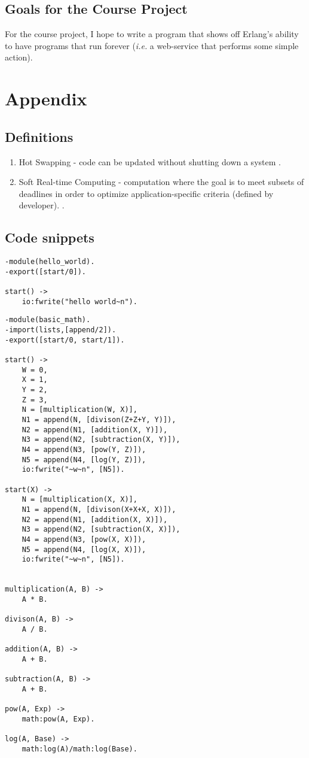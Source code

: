\documentclass[11 pt]{IEEEtran}
\begin{document}
\subsection{Goals for the Course Project}
For the course project, I hope to write a program that shows off Erlang's ability to have programs that run forever (\emph{i.e.} a web-service that performs some simple action). 

\newpage
\section{Appendix}
\subsection{Definitions}
\begin{enumerate}
\item  Hot Swapping - code can be updated without shutting down a system \cite{wiki}.
\item Soft Real-time Computing - computation where the goal is to meet subsets of deadlines in order to optimize application-specific criteria (defined by developer). \cite{soft-rt}.
\end{enumerate}
 
\subsection{Code snippets}

\begin{lstlisting}
-module(hello_world).
-export([start/0]).

start() ->
    io:fwrite("hello world~n").
\end{lstlisting}

\begin{lstlisting}
-module(basic_math).
-import(lists,[append/2]). 
-export([start/0, start/1]).

start() ->
    W = 0,
    X = 1,
    Y = 2,
    Z = 3,
    N = [multiplication(W, X)],
    N1 = append(N, [divison(Z+Z+Y, Y)]),
    N2 = append(N1, [addition(X, Y)]),
    N3 = append(N2, [subtraction(X, Y)]),
    N4 = append(N3, [pow(Y, Z)]),
    N5 = append(N4, [log(Y, Z)]),
    io:fwrite("~w~n", [N5]).

start(X) ->
    N = [multiplication(X, X)],
    N1 = append(N, [divison(X+X+X, X)]),
    N2 = append(N1, [addition(X, X)]),
    N3 = append(N2, [subtraction(X, X)]),
    N4 = append(N3, [pow(X, X)]),
    N5 = append(N4, [log(X, X)]),
    io:fwrite("~w~n", [N5]).


multiplication(A, B) -> 
    A * B.

divison(A, B) -> 
    A / B.

addition(A, B) -> 
    A + B.

subtraction(A, B) -> 
    A + B.

pow(A, Exp) ->
    math:pow(A, Exp).

log(A, Base) ->
    math:log(A)/math:log(Base).
\end{lstlisting}
\end{document}

